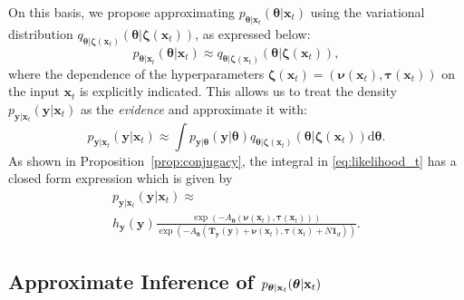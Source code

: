 On this basis, we propose approximating $p_{\boldsymbol{\theta}|\mathbf{x}_t}(\boldsymbol{\theta}|\mathbf{x}_t)$ using the variational distribution $q_{\boldsymbol{\theta}|\boldsymbol{\zeta}(\mathbf{x}_t)}(\boldsymbol{\theta}|\boldsymbol{\zeta}(\mathbf{x}_t))$, as expressed below:
\begin{equation*}
p_{\boldsymbol{\theta}|\mathbf{x}_t}(\boldsymbol{\theta}|\mathbf{x}_t) \approx q_{\boldsymbol{\theta}|\boldsymbol{\zeta}(\mathbf{x}_t)}(\boldsymbol{\theta}|\boldsymbol{\zeta}(\mathbf{x}_t)),
\end{equation*}
where the dependence of the hyperparameters $\boldsymbol{\zeta}(\mathbf{x}_t)  = \left(\boldsymbol{\nu}(\mathbf{x}_t) ,\boldsymbol{\tau}(\mathbf{x}_t)\right)$ on the input $\mathbf{x}_t$ is explicitly indicated.
This allows us to treat the density $p_{\mathbf{y}|\mathbf{x}_t}(\mathbf{y}|\mathbf{x}_{t})$ as the \textit{evidence} and approximate it with:
\begin{equation}
\label{eq:likelihood_t}
     p_{\mathbf{y}|\mathbf{x}_t}(\mathbf{y}|\mathbf{x}_{t})
     \approx\int p_{\mathbf{y}|\boldsymbol{\theta}}(\mathbf{y}|\boldsymbol{\theta}) q_{\boldsymbol{\theta}|\boldsymbol{\zeta}(\mathbf{x}_t)}(\boldsymbol{\theta}|\boldsymbol{\zeta}(\mathbf{x}_t)) \mathrm{d}\boldsymbol{\theta}.
\end{equation}
As shown in Proposition~\ref{prop:conjugacy}, the integral in \eqref{eq:likelihood_t} has a closed form expression which is given by 
\begin{multline}
\label{eq:likelihood_t-closed-form}
     p_{\mathbf{y}|\mathbf{x}_t}(\mathbf{y}|\mathbf{x}_{t}) \approx \\ h_{\mathbf{y}}(\mathbf{y}) \frac{\exp\left(-A_{\boldsymbol{\theta}}(\boldsymbol{\nu}(\mathbf{x}_t), \boldsymbol{\tau}(\mathbf{x}_t))\right)}{\exp\left(-A_{\boldsymbol{\theta}}(\mathbf{T}_{\mathbf{y}}(\mathbf{y}) + \boldsymbol{\nu}(\mathbf{x}_t), \boldsymbol{\tau}(\mathbf{x}_t) + N \mathbf{1}_d)\right)}.
\end{multline}

\subsection{Approximate Inference of  
$p_{\protect\boldsymbol{\theta}|\mathbf{x}_t}(\protect\boldsymbol{\theta}|\mathbf{x}_t)$}

